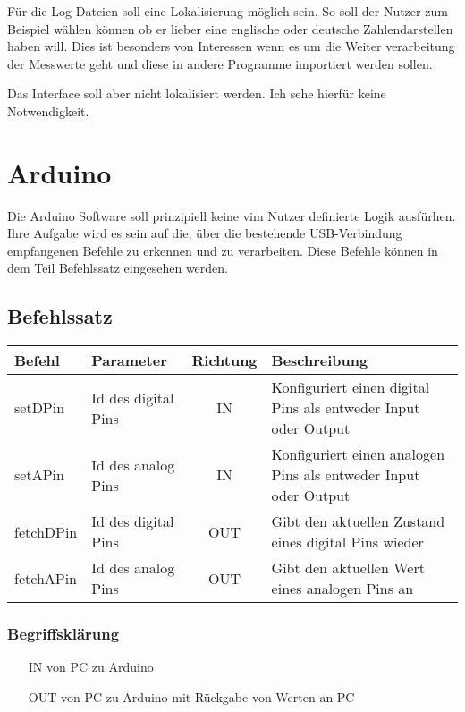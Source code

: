 Für die Log-Dateien soll eine Lokalisierung möglich sein. So soll der Nutzer zum 
Beispiel wählen können ob er lieber eine englische oder deutsche 
Zahlendarstellen haben will. Dies ist besonders von Interessen wenn es um die 
Weiter verarbeitung der Messwerte geht und diese in andere Programme importiert 
werden sollen. 

Das Interface soll aber nicht lokalisiert werden. Ich sehe hierfür keine 
Notwendigkeit.

\section {Arduino}
Die Arduino Software soll prinzipiell keine vim Nutzer definierte Logik 
ausfürhen. Ihre Aufgabe wird es sein auf die, über die bestehende 
USB-Verbindung empfangenen Befehle zu erkennen und zu verarbeiten. Diese 
Befehle können in dem Teil Befehlssatz eingesehen werden.
\subsection{Befehlssatz}
\begin{tabular}{l|l|c|l}
Befehl&Parameter& Richtung&Beschreibung\\\hline
setDPin&Id des digital Pins&IN&Konfiguriert einen digital Pins als entweder 
Input oder Output\\
setAPin&Id des analog Pins&IN&Konfiguriert einen analogen Pins als entweder 
Input oder Output\\
fetchDPin&Id des digital Pins&OUT&Gibt den aktuellen Zustand eines digital Pins 
wieder\\
fetchAPin&Id des analog Pins&OUT&Gibt den aktuellen Wert eines analogen Pins 
an\\
\end{tabular}

\subsubsection{Begriffsklärung}
\begin{itemize}
 \item[IN] von PC zu Arduino
 \item[OUT] von PC zu Arduino mit Rückgabe von Werten an PC
\end{itemize}

